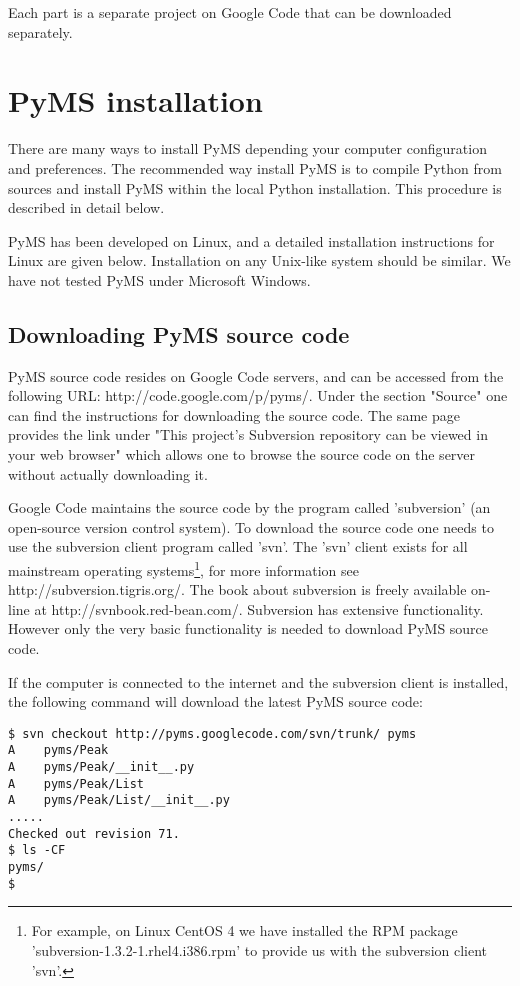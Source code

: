 Each part is a separate project on Google Code that can be downloaded
separately.

\section{PyMS installation}

There are many ways to install PyMS depending your computer configuration
and preferences. The recommended way install PyMS is to compile Python
from sources and install PyMS within the local Python installation. This
procedure is described in detail below.

PyMS has been developed on Linux, and a detailed installation instructions
for Linux are given below. Installation on any Unix-like system should be
similar. We have not tested PyMS under Microsoft Windows.

\subsection{Downloading PyMS source code}

PyMS source code resides on Google Code servers, and can be accessed
from the following URL: http://code.google.com/p/pyms/. Under the
section "Source" one can find the instructions for downloading the
source code. The same page provides the link under "This project's
Subversion repository can be viewed in your web browser" which allows
one to browse the source code on the server without actually downloading
it.

Google Code maintains the source code by the program called 'subversion'
(an open-source version control system).  To download the source code
one needs to use the subversion client program called 'svn'. The 'svn'
client exists for all mainstream operating systems\footnote{For example,
on Linux CentOS 4 we have installed the RPM package
'subversion-1.3.2-1.rhel4.i386.rpm' to provide us with the subversion
client 'svn'.}, for more information see http://subversion.tigris.org/.
The book about subversion is freely available on-line at
http://svnbook.red-bean.com/. Subversion has extensive functionality.
However only the very basic functionality is needed to download PyMS
source code.

If the computer is connected to the internet and the subversion client
is installed, the following command will download the latest PyMS source
code:

\begin{verbatim}
$ svn checkout http://pyms.googlecode.com/svn/trunk/ pyms
A    pyms/Peak
A    pyms/Peak/__init__.py
A    pyms/Peak/List
A    pyms/Peak/List/__init__.py
.....
Checked out revision 71.
$ ls -CF
pyms/
$
\end{verbatim}

